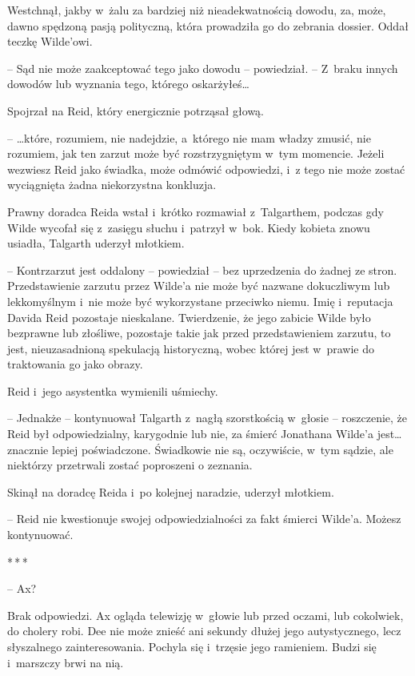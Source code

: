 \documentclass[oneside,polish,11pt,sfheadings]{mwbk}
\newcommand{\threeast}{\bigskip\par\centerline{*\,*\,*}\medskip\par}
\begin{document}
Westchnął, jakby w~żalu za bardziej niż nieadekwatnością dowodu, za,
może, dawno spędzoną pasją polityczną, która prowadziła go do zebrania
dossier. Oddał teczkę Wilde'owi.

-- Sąd nie może zaakceptować tego jako dowodu -- powiedział. -- Z~braku
innych dowodów lub wyznania tego, którego oskarżyłeś\ldots

Spojrzał na Reid, który energicznie potrząsał głową.

-- \ldots które, rozumiem, nie nadejdzie, a~którego nie mam władzy zmusić,
nie rozumiem, jak ten zarzut może być rozstrzygniętym w~tym momencie.
Jeżeli wezwiesz Reid jako świadka, może odmówić odpowiedzi, i~z tego nie
może zostać wyciągnięta żadna niekorzystna konkluzja.

Prawny doradca Reida wstał i~krótko rozmawiał z~Talgarthem, podczas gdy
Wilde wycofał się z~zasięgu słuchu i~patrzył w~bok. Kiedy kobieta znowu
usiadła, Talgarth uderzył młotkiem.

-- Kontrzarzut jest oddalony -- powiedział -- bez uprzedzenia do żadnej ze
stron. Przedstawienie zarzutu przez Wilde'a nie może być nazwane
dokuczliwym lub lekkomyślnym i~nie może być wykorzystane przeciwko
niemu. Imię i~reputacja Davida Reid pozostaje nieskalane. Twierdzenie,
że jego zabicie Wilde było bezprawne lub złośliwe, pozostaje takie jak
przed przedstawieniem zarzutu, to jest, nieuzasadnioną spekulacją
historyczną, wobec której jest w~prawie do traktowania go jako obrazy.

Reid i~jego asystentka wymienili uśmiechy.

-- Jednakże -- kontynuował Talgarth z~nagłą szorstkością w~głosie -- roszczenie, że Reid był odpowiedzialny, karygodnie lub nie, za śmierć
Jonathana Wilde'a jest\ldots znacznie lepiej poświadczone. Świadkowie nie
są, oczywiście, w~tym sądzie, ale niektórzy przetrwali zostać poproszeni
o zeznania.

Skinął na doradcę Reida i~po kolejnej naradzie, uderzył młotkiem.

-- Reid nie kwestionuje swojej odpowiedzialności za fakt śmierci Wilde'a. Możesz kontynuować.

\threeast

-- Ax?

Brak odpowiedzi. Ax ogląda telewizję w~głowie lub przed oczami, lub
cokolwiek, do cholery robi. Dee nie może znieść ani sekundy dłużej jego
autystycznego, lecz słyszalnego zainteresowania. Pochyla się i~trzęsie
jego ramieniem. Budzi się i~marszczy brwi na nią.
\end{document}

